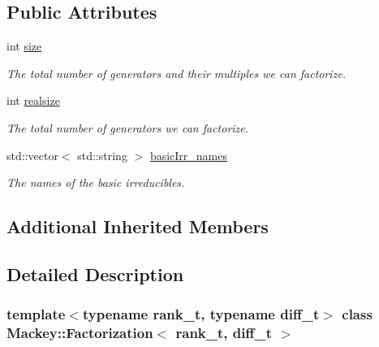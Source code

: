 \subsection*{Public Attributes}
\begin{DoxyCompactItemize}
\item 
int \hyperlink{classMackey_1_1Factorization_ab958c9491e2e63d0861d92599b0d237d}{size}
\begin{DoxyCompactList}\small\item\em The total number of generators and their multiples we can factorize. \end{DoxyCompactList}\item 
int \hyperlink{classMackey_1_1Factorization_af5f29d56f33e4835aa699d9d6708b6c8}{realsize}
\begin{DoxyCompactList}\small\item\em The total number of generators we can factorize. \end{DoxyCompactList}\item 
std\+::vector$<$ std\+::string $>$ \hyperlink{classMackey_1_1Factorization_aafee5aadae0d83b75741e0e8c2955625}{basic\+Irr\+\_\+names}
\begin{DoxyCompactList}\small\item\em The names of the basic irreducibles. \end{DoxyCompactList}\end{DoxyCompactItemize}
\subsection*{Additional Inherited Members}


\subsection{Detailed Description}
\subsubsection*{template$<$typename rank\+\_\+t, typename diff\+\_\+t$>$\newline
class Mackey\+::\+Factorization$<$ rank\+\_\+t, diff\+\_\+t $>$}

